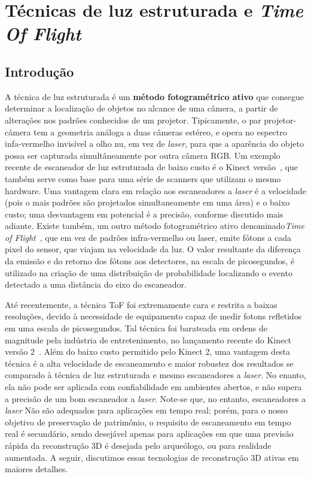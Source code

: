\chapter{Técnicas de luz estruturada e \emph{Time Of Flight}}\label{cap:kinect}

\section*{Introdução}

A técnica de luz estruturada é um
\textbf{método fotogramétrico ativo} que consegue determinar a localização de
objetos no alcance de uma câmera, a partir de alterações nos padrões conhecidos
de um projetor.  Tipicamente, o par projetor-câmera tem a geometria análoga a
duas câmeras estéreo, e opera no espectro infa-vermelho invisível a olho nu, em
vez de \emph{laser}, para que a aparência do objeto possa ser capturada
simultâneamente por outra câmera RGB.  Um exemplo recente de escaneador de luz
estruturada de baixo custo é o Kinect versão~\cite{smisek20133d}, que também
serve como base para uma série de scanners que utilizam o mesmo hardware. Uma
vantagem clara em relação aos escaneadores a \emph{laser} é a velocidade (pois o
mais padrões são projetados simultaneamente em uma área) e o
baixo custo; uma desvantagem em potencial é a precisão, conforme discutido mais adiante.
Existe também, um outro método fotogramétrico ativo denominado\emph{Time of
Flight}~\cite{gokturk2004time}, que em vez de padrões infra-vermelho ou laser,
emite fótons a cada pixel do sensor, que viajam na velocidade da luz. O valor resultante
da diferença da emissão e do retorno dos fótons aos detectores, na escala de picosegundos, é utilizado na
criação de uma distribuição de probabilidade localizando o evento detectado a
uma distância do eixo do escaneador.

Até recentemente, a técnica ToF foi extremamente cara e restrita a baixas resoluções, devido à
necessidade de equipamento capaz de medir fotons refletidos em uma escala de
picosegundos. Tal técnica foi barateada em ordens de magnitude pela indústria
de entretenimento, no lançamento recente do Kinect versão
2~\cite{lachat2015first,valgma20163d}. Além do baixo custo permitido pelo
Kinect 2, uma vantagem desta técnica é a alta velocidade de escaneamento e
maior robustez dos resultados se comparado à técnica de luz estruturada e mesmo escaneadores a \emph{laser}.
No enanto, ela não pode ser aplicada com confiabilidade em ambientes abertos,
e não supera a precisão de um bom escaneador a \emph{laser}. Note-se que, no entanto, escaneadores a \emph{laser} Não são adequados para aplicações em tempo real; porém, para o nosso objetivo de preservação de patrimônio,
o requisito de escaneamento em tempo real é secundário, sendo desejável apenas para aplicações em que uma previsão rápida da reconstrução 3D é desejada pelo arqueólogo, ou para realidade aumentada.
A seguir, discutimos essas tecnologias de reconstrução 3D ativas em maiores detalhes.

